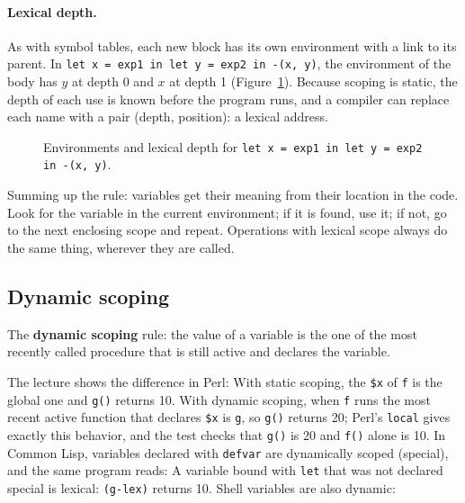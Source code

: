 \paragraph{Lexical depth.} As with symbol tables, each new block has its own
environment with a link to its parent. In \texttt{let x = exp1 in let y = exp2
in -(x, y)}, the environment of the body has $y$ at depth 0 and $x$ at depth 1
(Figure~\ref{fig:depth}). Because scoping is static, the depth of each use is
known before the program runs, and a compiler can replace each name with a
pair (depth, position): a lexical address.

\begin{figure}[h]
\centering
{}
\caption{Environments and lexical depth for \texttt{let x = exp1 in let y = exp2 in -(x, y)}.}
\label{fig:depth}
\end{figure}

Summing up the rule: variables get their meaning from their location in the
code. Look for the variable in the current environment; if it is found, use
it; if not, go to the next enclosing scope and repeat. Operations with
lexical scope always do the same thing, wherever they are called.

\subsection{Dynamic scoping}

\begin{definition}
The \textbf{dynamic scoping} rule: the value of a variable is the one of the
most recently called procedure that is still active and declares the
variable.
\end{definition}

The lecture shows the difference in Perl:
With static scoping, the \texttt{\$x} of \texttt{f} is the global one and
\texttt{g()} returns 10. With dynamic scoping, when \texttt{f} runs the most
recent active function that declares \texttt{\$x} is \texttt{g}, so \texttt{g()}
returns 20; Perl's \texttt{local} gives exactly this behavior, and the test
checks that \texttt{g()} is 20 and \texttt{f()} alone is 10. In Common Lisp,
variables declared with \texttt{defvar} are dynamically scoped (special), and
the same program reads:
A variable bound with \texttt{let} that was not declared special is lexical:
\texttt{(g-lex)} returns 10. Shell variables are also dynamic:

